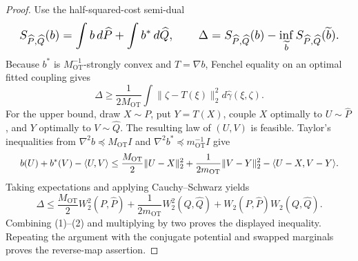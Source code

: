 \documentclass{article}
\begin{document}
\begin{proof}
Use the half-squared-cost semi-dual
\[
\makebox[\linewidth][c]{\resizebox{0.98\linewidth}{!}{\par\noindent \makebox[\linewidth][c]{\resizebox{0.98\linewidth}{!}{\(\displaystyle \displaystyle S_{\widehat P,\widehat Q}(b)=\int b\,d\widehat P+\int b^*\,d\widehat Q,\qquad \Delta=S_{\widehat P,\widehat Q}(b)-\inf_{\widetilde b}S_{\widehat P,\widehat Q}(\widetilde b).\)}}\par\noindent}}
\]
Because \(b^*\) is \(M_{\mathrm{OT}}^{-1}\)-strongly convex and \(T=\nabla b\), Fenchel equality on an optimal fitted coupling gives
\[\Delta\ge\frac1{2M_{\mathrm{OT}}}\int\lVert\zeta-T(\xi)\rVert_2^2d\widehat\gamma(\xi,\zeta).\tag{1}\]
For the upper bound, draw \(X\sim P\), put \(Y=T(X)\), couple \(X\) optimally to \(U\sim\widehat P\), and \(Y\) optimally to \(V\sim\widehat Q\). The resulting law of \((U,V)\) is feasible. Taylor's inequalities from \(\nabla^2b\preceq M_{\mathrm{OT}}I\) and \(\nabla^2b^*\preceq m_{\mathrm{OT}}^{-1}I\) give
\[
\makebox[\linewidth][c]{\resizebox{0.98\linewidth}{!}{\par\noindent \makebox[\linewidth][c]{\resizebox{0.98\linewidth}{!}{\(\displaystyle \displaystyle b(U)+b^*(V)-\langle U,V\rangle\le\frac{M_{\mathrm{OT}}}{2}\lVert U-X\rVert_2^2+\frac1{2m_{\mathrm{OT}}}\lVert V-Y\rVert_2^2-\langle U-X,V-Y\rangle.\)}}\par\noindent}}
\]
Taking expectations and applying Cauchy--Schwarz yields
\[\Delta\le\frac{M_{\mathrm{OT}}}{2}W_2^2(P,\widehat P)+\frac1{2m_{\mathrm{OT}}}W_2^2(Q,\widehat Q)+W_2(P,\widehat P)W_2(Q,\widehat Q).\tag{2}\]
Combining (1)--(2) and multiplying by two proves the displayed inequality. Repeating the argument with the conjugate potential and swapped marginals proves the reverse-map assertion.
\end{proof}
\end{document}
